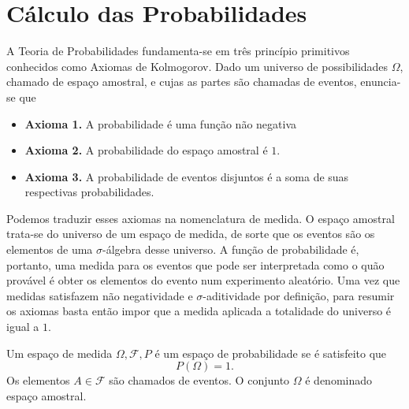 \section{Cálculo das Probabilidades}

A Teoria de Probabilidades fundamenta-se em três princípio primitivos conhecidos
como Axiomas de Kolmogorov.
Dado um universo de possibilidades $\Omega$, chamado de espaço amostral, e cujas as
partes são chamadas de eventos, enuncia-se que
\begin{itemize}
	\item \textbf{Axioma 1.} A probabilidade é uma função não negativa
	\item \textbf{Axioma 2.} A probabilidade do espaço amostral é $1$.
	\item \textbf{Axioma 3.} A probabilidade de eventos disjuntos é a soma de suas
	      respectivas probabilidades.
\end{itemize}

Podemos traduzir esses axiomas na nomenclatura de medida.
O espaço amostral trata-se do universo de um espaço de medida, de sorte que os eventos
são os elementos de uma $\sigma$-álgebra desse universo.
A função de probabilidade é, portanto, uma medida para os eventos que pode ser interpretada
como o quão provável é obter os elementos do evento num experimento aleatório.
Uma vez que medidas satisfazem não negatividade e $\sigma$-aditividade por definição,
para resumir os axiomas basta então impor que a medida aplicada a totalidade do universo
é igual a $1$.

\begin{def:espaco de probabilidade}
Um espaço de medida \(\Omega, \mathcal{F}, P\) é um espaço de probabilidade se é satisfeito
que
\[
	P(\Omega) = 1.
\]
Os elementos $A \in \mathcal{F}$ são chamados de eventos.
O conjunto $\Omega$ é denominado espaço amostral.
\end{def:espaco de probabilidade}



